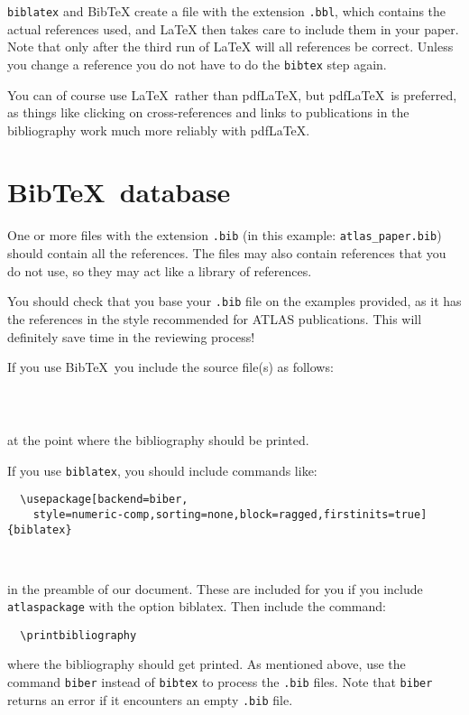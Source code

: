 \documentclass[UKenglish]{latex/atlasdoc}
\newcommand*{\BibTeX}{Bib\TeX}
\newcommand{\File}[1]{\texttt{#1}\xspace}
\newcommand{\Option}[1]{\textsf{#1}\xspace}
\newcommand{\Package}[1]{\texttt{#1}\xspace}
\begin{document}
\Package{biblatex} and \BibTeX{} create a file with the extension \texttt{.bbl}, which
contains the actual references used, and \LaTeX{} then takes care
to include them in your paper. Note that only after the third run of
\LaTeX{} will all references be correct. Unless you change a reference
you do not have to do the \texttt{bibtex} step again.

You can of course use \LaTeX\ rather than pdf\LaTeX, but pdf\LaTeX\ is preferred,
as things like clicking on cross-references and links to publications in the bibliography
work much more reliably with pdf\LaTeX.


\section{\BibTeX\ database}

One or more files with the extension \texttt{.bib} 
(in this example: \texttt{atlas\_paper.bib}) should contain all the references. 
The files may also contain references that you do not use, so they may act like a
library of references. 

You should check that you base your \File{.bib} file on the examples provided,
as it has the references in the style recommended for ATLAS publications.
This will definitely save time in the reviewing process!

If you use \BibTeX\ you include the source file(s) as follows:
%
\begin{verbatim}
  
  
\end{verbatim}
at the point where the bibliography should be printed.

If you use \Package{biblatex}, you should include commands like:
%
\begin{verbatim}
  \usepackage[backend=biber,
    style=numeric-comp,sorting=none,block=ragged,firstinits=true]{biblatex}
  
  
\end{verbatim}
%
in the preamble of our document.
These are included for you if you include \Package{atlaspackage} with the option \Option{biblatex}.
Then include the command:
%
\begin{verbatim}
  \printbibliography
\end{verbatim}
%
where the bibliography should get printed.
As mentioned above, use the command \texttt{biber} instead of \texttt{bibtex} to process the \texttt{.bib} files.
Note that \texttt{biber} returns an error if it encounters an empty \texttt{.bib} file.
\end{document}
